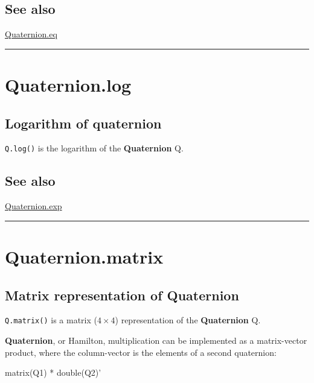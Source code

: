 \subsection*{See also}


\hyperlink{Quaternion.eq}{\color{blue} Quaternion.eq}

\vspace{1.5ex}\hrule

\hypertarget{Quaternion.log}{\section*{Quaternion.log}}
\subsection*{Logarithm of quaternion}


\texttt{Q.log()} is the logarithm of the \textbf{\color{red} Quaternion} Q.


\subsection*{See also}


\hyperlink{Quaternion.exp}{\color{blue} Quaternion.exp}

\vspace{1.5ex}\hrule

\hypertarget{Quaternion.matrix}{\section*{Quaternion.matrix}}
\subsection*{Matrix representation of Quaternion}


\texttt{Q.matrix()} is a matrix ($4 \times 4$) representation of the \textbf{\color{red} Quaternion} Q.



\textbf{\color{red} Quaternion}, or Hamilton, multiplication can be implemented as a
matrix-vector product, where the column-vector is the elements of a
second quaternion:

\begin{Code}
    matrix(Q1) * double(Q2)'

\end{Code}

